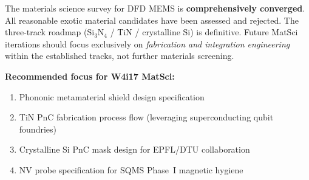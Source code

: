 \documentclass[11pt]{article}
\theoremstyle{definition}
\theoremstyle{remark}
\begin{document}
The materials science survey for DFD MEMS is \textbf{comprehensively
converged}. All reasonable exotic material candidates have been assessed
and rejected. The three-track roadmap (Si$_3$N$_4$ / TiN / crystalline
Si) is definitive. Future MatSci iterations should focus exclusively on
\textit{fabrication and integration engineering} within the established
tracks, not further materials screening.

\textbf{Recommended focus for W4i17 MatSci:}
\begin{enumerate}[nosep]
\item Phononic metamaterial shield design specification
\item TiN PnC fabrication process flow (leveraging superconducting
  qubit foundries)
\item Crystalline Si PnC mask design for EPFL/DTU collaboration
\item NV probe specification for SQMS Phase~I magnetic hygiene
\end{enumerate}
\end{document}
